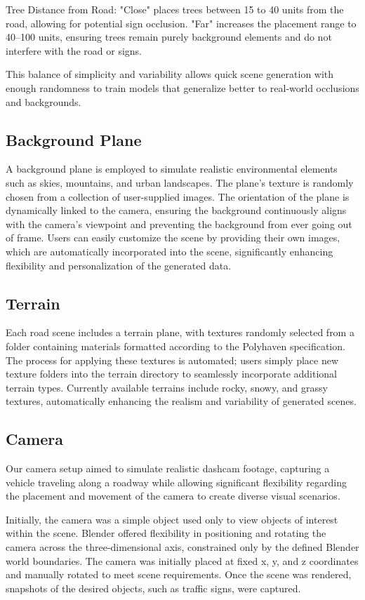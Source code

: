 \documentclass[journal]{IEEEtran}
\begin{document}
Tree Distance from Road:
"Close" places trees between 15 to 40 units from the road, allowing for potential sign occlusion.
"Far" increases the placement range to 40–100 units, ensuring trees remain purely background elements and do not interfere with the road or signs.

This balance of simplicity and variability allows quick scene generation with enough randomness to train models that generalize better to real-world occlusions and backgrounds.

\subsection{Background Plane} A background plane is employed to simulate realistic environmental elements such as skies, mountains, and urban landscapes. The plane’s texture is randomly chosen from a collection of user-supplied images. The orientation of the plane is dynamically linked to the camera, ensuring the background continuously aligns with the camera's viewpoint and preventing the background from ever going out of frame. Users can easily customize the scene by providing their own images, which are automatically incorporated into the scene, significantly enhancing flexibility and personalization of the generated data.

\subsection{Terrain} Each road scene includes a terrain plane, with textures randomly selected from a folder containing materials formatted according to the Polyhaven specification. The process for applying these textures is automated; users simply place new texture folders into the terrain directory to seamlessly incorporate additional terrain types. Currently available terrains include rocky, snowy, and grassy textures, automatically enhancing the realism and variability of generated scenes.

\subsection{Camera}
Our camera setup aimed to simulate realistic dashcam footage, capturing a vehicle traveling along a roadway while allowing significant flexibility regarding the placement and movement of the camera to create diverse visual scenarios. 

Initially, the camera was a simple object used only to view objects of interest within the scene. Blender offered flexibility in positioning and rotating the camera across the three-dimensional axis, constrained only by the defined Blender world boundaries. The camera was initially placed at fixed x, y, and z coordinates and manually rotated to meet scene requirements. Once the scene was rendered, snapshots of the desired objects, such as traffic signs, were captured.
\end{document}
